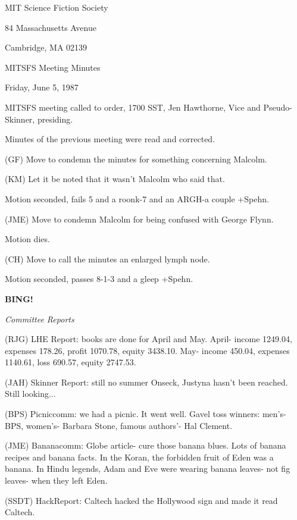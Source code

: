 \documentclass[12pt]{article}
\newcommand{\bing}{{\bf BING!} }
\newcommand{\goto}[1]{\bing \vskip 12pt \centerline{{\em{#1}}}}
\begin{document}
\begin{center}

MIT Science Fiction Society 

84 Massachusetts Avenue

Cambridge, MA 02139

\vspace{12pt}

MITSFS Meeting Minutes 

Friday, June 5, 1987

\end{center}
 
\vspace{18pt}

\setlength{\parskip}{6pt}

\noindent
MITSFS meeting called to order, 1700 SST,
Jen Hawthorne, Vice and Pseudo-Skinner, presiding.

Minutes of the previous meeting were read and corrected.

(GF) Move to condemn the minutes for something concerning Malcolm.

(KM) Let it be noted that it wasn't Malcolm who said that.

Motion seconded, fails 5 and a roonk-7 and an ARGH-a couple +Spehn.

(JME) Move to condemn Malcolm for being confused with George Flynn.

Motion dies.

(CH) Move to call the minutes an enlarged lymph node.

Motion seconded, passes 8-1-3 and a gleep +Spehn.

\goto{Committee Reports}

(RJG) LHE Report: books are done for April and May. April- income 1249.04, expenses 178.26, profit 1070.78, equity 3438.10. May- income 450.04, expenses 1140.61, loss 690.57, equity 2747.53.

(JAH) Skinner Report: still no summer Onseck, Justyna hasn't been reached. Still looking...

(BPS) Picniccomm: we had a picnic. It went well. Gavel toss winners: men's- BPS, women's- Barbara Stone, famous authors'- Hal Clement.

(JME) Bananacomm: Globe article- cure those banana blues. Lots of banana recipes and banana facts. In the Koran, the forbidden fruit of Eden was a banana. In Hindu legends, Adam and Eve were wearing banana leaves- not fig leaves- when they left Eden.

(SSDT) HackReport: Caltech hacked the Hollywood sign and made it read Caltech.
\end{document}
